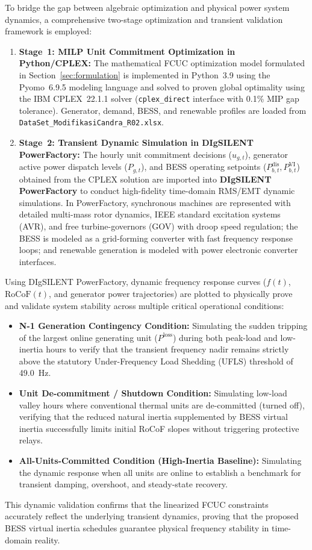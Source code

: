 \documentclass[journal]{IEEEtran}
\begin{document}
To bridge the gap between algebraic optimization and physical power system dynamics, a comprehensive two-stage optimization and transient validation framework is employed:
\begin{enumerate}
  \item \textbf{Stage~1: MILP Unit Commitment Optimization in Python/CPLEX:}
    The mathematical FCUC optimization model formulated in Section~\ref{sec:formulation} is implemented in Python~3.9 using the Pyomo~6.9.5 modeling language and solved to proven global optimality using the IBM CPLEX~22.1.1 solver (\texttt{cplex\_direct} interface with 0.1\% MIP gap tolerance). Generator, demand, BESS, and renewable profiles are loaded from \texttt{DataSet\_ModifikasiCandra\_R02.xlsx}.
  
  \item \textbf{Stage~2: Transient Dynamic Simulation in DIgSILENT PowerFactory:}
    The hourly unit commitment decisions ($u_{g,t}$), generator active power dispatch levels ($P_{g,t}$), and BESS operating setpoints ($P_{b,t}^{\text{dis}}, P_{b,t}^{\text{VI}}$) obtained from the CPLEX solution are imported into \textbf{DIgSILENT PowerFactory} to conduct high-fidelity time-domain RMS/EMT dynamic simulations. In PowerFactory, synchronous machines are represented with detailed multi-mass rotor dynamics, IEEE standard excitation systems (AVR), and free turbine-governors (GOV) with droop speed regulation; the BESS is modeled as a grid-forming converter with fast frequency response loops; and renewable generation is modeled with power electronic converter interfaces.
\end{enumerate}

Using DIgSILENT PowerFactory, dynamic frequency response curves ($f(t)$, $\text{RoCoF}(t)$, and generator power trajectories) are plotted to physically prove and validate system stability across multiple critical operational conditions:
\begin{itemize}
  \item \textbf{N-1 Generation Contingency Condition:} Simulating the sudden tripping of the largest online generating unit ($P^{\text{loss}}$) during both peak-load and low-inertia hours to verify that the transient frequency nadir remains strictly above the statutory Under-Frequency Load Shedding (UFLS) threshold of 49.0~Hz.
  \item \textbf{Unit De-commitment / Shutdown Condition:} Simulating low-load valley hours where conventional thermal units are de-committed (turned off), verifying that the reduced natural inertia supplemented by BESS virtual inertia successfully limits initial RoCoF slopes without triggering protective relays.
  \item \textbf{All-Units-Committed Condition (High-Inertia Baseline):} Simulating the dynamic response when all units are online to establish a benchmark for transient damping, overshoot, and steady-state recovery.
\end{itemize}
This dynamic validation confirms that the linearized FCUC constraints accurately reflect the underlying transient dynamics, proving that the proposed BESS virtual inertia schedules guarantee physical frequency stability in time-domain reality.
\end{document}
